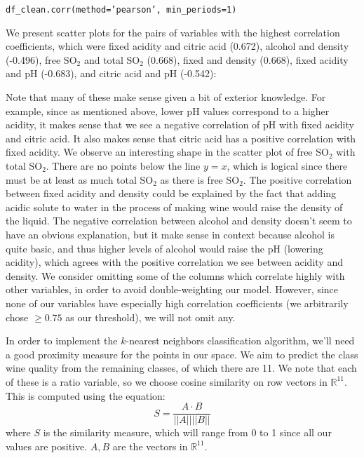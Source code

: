 \documentclass[11pt,oneside,reqno]{amsart}
\theoremstyle{plain}
\theoremstyle{definition}
\theoremstyle{remark}
\newcommand{\fracc}{\frac}
\newcommand{\inlinecode}{\texttt}
\begin{document}
\begin{center}
\inlinecode{df\_clean.corr(method='pearson', min\_periods=1)}
\end{center}
We present scatter plots for the pairs of variables with the highest correlation coefficients, which were fixed acidity and citric acid (0.672), alcohol and density (-0.496), free SO$_2$ and total SO$_2$ (0.668), fixed and density (0.668), fixed acidity and pH (-0.683), and citric acid and pH (-0.542):
\begin{adjustbox}{center}
\end{adjustbox}
Note that many of these make sense given a bit of exterior knowledge. For example, since as mentioned above, lower pH values correspond to a higher acidity, it makes sense that we see a negative correlation of pH with fixed acidity and citric acid. It also makes sense that citric acid has a positive correlation with fixed acidity. We observe an interesting shape in the scatter plot of free SO$_2$ with total SO$_2$. There are no points below the line $y = x$, which is logical since there must be at least as much total SO$_2$ as there is free SO$_2$. The positive correlation between fixed acidity and density could be explained by the fact that adding acidic solute to water in the process of making wine would raise the density of the liquid. The negative correlation between alcohol and density doesn't seem to have an obvious explanation, but it make sense in context because alcohol is quite basic, and thus higher levels of alcohol would raise the pH (lowering acidity), which agrees with the positive correlation we see between acidity and density. We consider omitting some of the columns which correlate highly with other variables, in order to avoid double-weighting our model. However, since none of our variables have especially high correlation coefficients (we arbitrarily chose $\geq 0.75$ as our threshold), we will not omit any. 

In order to implement the $k$-nearest neighbors classification algorithm, we'll need a good proximity measure for the points in our space. We aim to predict the class wine quality from the remaining classes, of which there are 11. We note that each of these is a ratio variable, so we choose cosine similarity on row vectors in $\mathbb{R}^{11}$. This is computed using the equation:
$$
S = \fracc{A \cdot B}{||A||||B||}
$$
where $S$ is the similarity measure, which will range from 0 to 1 since all our values are positive. $A,B$ are the vectors in $\mathbb{R}^{11}$. 
\end{document}
